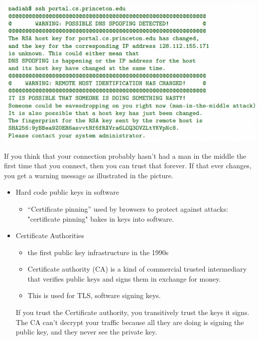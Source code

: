 \documentclass[11pt]{article} %
\begin{document}
\begin{center}
	\includegraphics[scale=0.5]{./Trust-in-keys1.png}
\end{center}

  If you think that your connection probably hasn't had a man in the middle the first time that you connect, then you can trust that forever. If that ever changes, you get a warning message as illustrated in the picture.

\begin{itemize}
  \item Hard code public keys in software
  \begin{itemize}\item “Certificate pinning” used by browsers to protect against attacks: "certificate pinning" bakes in keys into software.
 
  \end{itemize}
\end{itemize}

\begin{itemize}
  \item Certificate Authorities
  \begin{itemize}\item the first public key infrastructure in the 1990s
  \item Certificate authority (CA) is  a kind of commercial trusted intermediary that verifies public keys and signs them in exchange for money. 
  \item This is used for TLS, software signing keys. 
  \end{itemize}
    If you trust the Certificate authority, you transitively trust the keys it signs. The CA can't decrypt your traffic because all they are doing is signing the public key, and they never see the private key.
\end{itemize}
\end{document}
